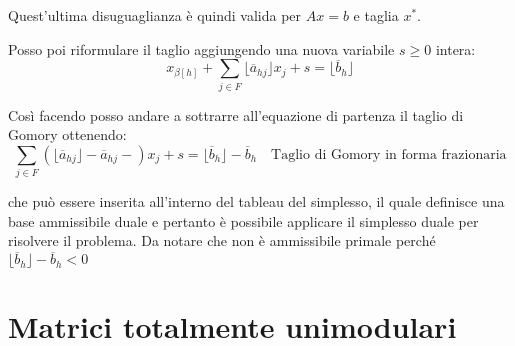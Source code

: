 \begin{itemize}
	Quest'ultima disuguaglianza è quindi valida per $Ax = b$ e taglia $x^*$.
	
	Posso poi riformulare il taglio aggiungendo una nuova variabile $s\geq 0$ intera:
	$$
	 x_{\beta[h]} + \sum_{j \in F} \lfloor \overline{a}_{hj} \rfloor x_j + s =  \lfloor \overline{b}_h\rfloor
	$$
	
	Così facendo posso andare a sottrarre all'equazione di partenza il taglio di Gomory ottenendo:
	$$
	\sum_{j\in F}(\lfloor \overline{a}_{hj} \rfloor-  \overline{a}_{hj}-)x_j + s = \lfloor \overline{b}_h\rfloor -\overline{b}_h \quad \text{Taglio di Gomory in forma frazionaria}
	$$
	
	che può essere inserita all'interno del tableau del simplesso, il quale definisce una base ammissibile duale e pertanto è possibile applicare il simplesso duale per risolvere il problema. Da notare che non è ammissibile primale perché $\lfloor \overline{b}_h\rfloor -\overline{b}_h < 0$ 
\end{itemize}


\section{Matrici totalmente unimodulari}

